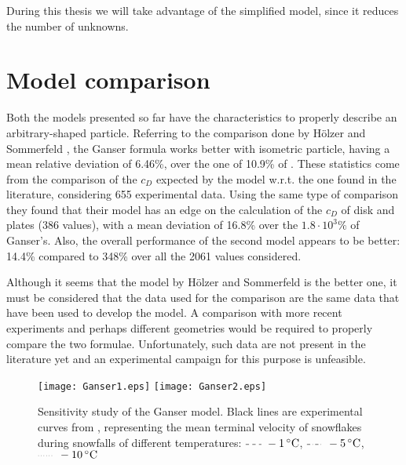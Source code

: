 		During this thesis we will take advantage of the simplified model, since it reduces the number of unknowns.
		

	\section{Model comparison}
		Both the models presented so far have the characteristics to properly describe an arbitrary-shaped particle. Referring to the comparison done by H\"{o}lzer and Sommerfeld \cite{HoltzerSommerfeld-2008}, the Ganser formula works better with isometric particle, having a mean relative deviation of 6.46\%, over the one of 10.9\% of . These statistics come from the comparison of the $ c_D $ expected by the model w.r.t. the one found in the literature, considering 655 experimental data. Using the same type of comparison they found that their model has an edge on the calculation of the $ c_D $ of disk and plates (386 values), with a mean deviation of 16.8\% over the $ 1.8 \cdot 10^3 \% $ of Ganser's. Also, the overall performance of the second model appears to be better: 14.4\% compared to 348\% over all the 2061 values considered. 
		
		Although it seems that the model by H\"{o}lzer and Sommerfeld is the better one, it must be considered that the data used for the comparison are the same data that have been used to develop the model. A comparison with more recent experiments and perhaps different geometries would be required to properly compare the two formulae. Unfortunately, such data are not present in the literature yet and an experimental campaign for this purpose is unfeasible. 
		
		\begin{figure}
			\centering
			\texttt{[image: Ganser1.eps]}
			\texttt{[image: Ganser2.eps]}
			\caption[Sensitivity study of the Ganser model.]{Sensitivity study of the Ganser model. Black lines are experimental curves from \cite{BrandesIkedEtAl-2008}, representing the mean terminal velocity of snowflakes during snowfalls of different temperatures: 
				$ \tikz[baseline] {\draw[dashed] (0,.5ex)--(.5,.5ex) ;} ~\SI{-1}{\celsius} $,
				$ \tikz[baseline] {\draw[dash dot] (0,.5ex)--(.5,.5ex) ;} ~\SI{-5}{\celsius} $,
				$ \tikz[baseline] {\draw[dotted] (0,.5ex)--(.5,.5ex) ;} ~\SI{-10}{\celsius} $}
			\label{fig: sensitivityGanser}
		\end{figure}	
		
